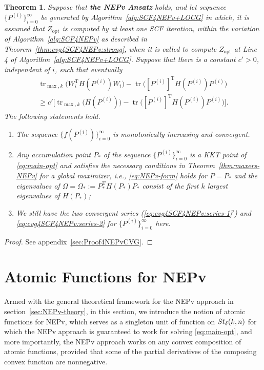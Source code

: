 \documentclass[11pt]{article}
\newcommand\STMnbr{{\rm St}_{\delta}(k,n)}
\DeclareMathOperator*{\opt}{opt}
\DeclareMathOperator{\tr}{tr}
\DeclareMathOperator{\T}{T}
\newtheorem{theorem}{Theorem}[section]
\theoremstyle{definition}
\numberwithin{equation}{section}
\begin{document}
\begin{theorem}\label{thm:cvg4SCFvLOCG:NEPv}
Suppose that {\bf the NEPv Ansatz} holds, and let sequence $\{P^{(i)}\}_{i=0}^{\infty}$ be generated by Algorithm~\ref{alg:SCF4NEPv+LOCG}
in which, it is assumed that $Z_{\opt}$ is computed by at least one SCF iteration, within
the variation of Algorithm~\ref{alg:SCF4NEPv} as described in
Theorem~\ref{thm:cvg4SCF4NEPv:strong}, when it is called to compute $Z_{\opt}$
at Line 4 of Algorithm~\ref{alg:SCF4NEPv+LOCG}. Suppose that  there is a constant $c'>0$, independent of $i$,
such that eventually
\begin{multline}\label{eq:cvg4SCFvLOCG:NEPv:assume}
\tr_{\max,k}\big(W_i^{\T}H(P^{(i)})W_i\big)-\tr\big([P^{(i)}]^{\T}H(P^{(i)})P^{(i)}\big) \\
   \ge c'\Big[\tr_{\max,k}\big(H(P^{(i)})\big)-\tr\big([P^{(i)}]^{\T}H(P^{(i)})P^{(i)}\big)\Big].
\end{multline}
The following statements hold.
\begin{enumerate}[{\rm (a)}]
  \item The sequence $\{f(P^{(i)})\}_{i=0}^{\infty}$ is monotonically increasing and convergent.
  \item Any accumulation point $P_*$ of the sequence $\{P^{(i)}\}_{i=0}^{\infty}$ is a KKT point of \eqref{eq:main-opt} and
        satisfies the necessary conditions in Theorem~\ref{thm:maxers-NEPv} for a global maximizer, i.e.,
        \eqref{eq:NEPv-form} holds for $P=P_*$ and the eigenvalues of $\Omega=\Omega_*:=P_*^{\T}H(P_*)P_*$
        consist of the first $k$ largest eigenvalues of $H(P_*)$;
  \item We still have the two convergent series {\rm (\ref{eq:cvg4SCF4NEPv:series-1}$'$)} and \eqref{eq:cvg4SCF4NEPv:series-2} for $\{P^{(i)}\}_{i=0}^{\infty}$ here.
\end{enumerate}
\end{theorem}

\begin{proof}
See appendix~\ref{sec:Proof4NEPvCVG}.
\end{proof}



\section{Atomic Functions for NEPv}\label{sec:AF-NEPv}
Armed with the general theoretical framework for the NEPv approach in
section~\ref{sec:NEPv-theory},
in this section, we introduce the notion of atomic functions for NEPv, which serves as
a singleton unit of function on $\STMnbr$
for which the NEPv approach is guaranteed to work for solving \eqref{eq:main-opt}, and more importantly,
the NEPv approach works on any convex composition of atomic functions,
provided that some of the partial derivatives
of the composing convex function are  nonnegative.
\end{document}
